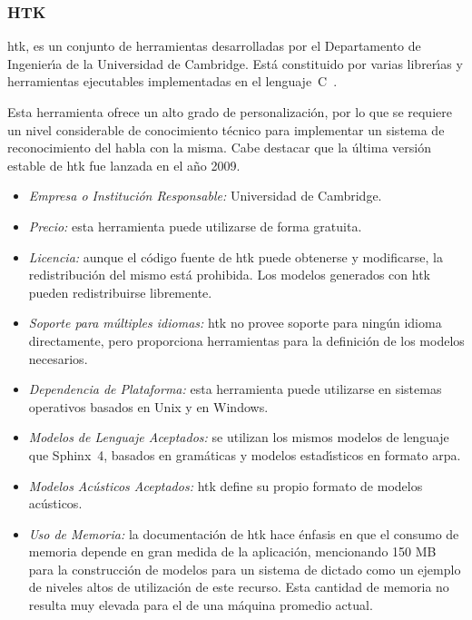 \subsubsection{HTK}
\label{sec:htk}

\gls{htk}, es un conjunto de herramientas
desarrolladas por el Departamento de Ingenier{\'\i}a de la Universidad de Cambridge. Est\'a constituido
por varias librer{\'\i}as y herramientas ejecutables implementadas en el \mbox{lenguaje C \cite{HTKHomePage}}.

Esta herramienta ofrece un alto grado de personalizaci\'on, por lo que se requiere un nivel considerable
de conocimiento t\'ecnico para implementar un sistema de reconocimiento del habla con la misma.
Cabe destacar que la \'ultima versi\'on estable de \gls{htk} fue lanzada en el a\~no 2009.

\begin{itemize}
	\item \emph{Empresa o Instituci\'on Responsable:} Universidad de Cambridge.
	\item \emph{Precio:} esta herramienta puede utilizarse de forma gratuita.
	\item \emph{Licencia:} aunque el c\'odigo fuente de \gls{htk} puede obtenerse y modificarse,
	la redistribuci\'on del mismo est\'a prohibida. Los modelos generados con \gls{htk} pueden
	redistribuirse libremente.
	\item \emph{Soporte para m\'ultiples idiomas:} \gls{htk} no provee soporte para ning\'un
	idioma directamente, pero proporciona herramientas para la definici\'on de los modelos necesarios.
	\item \emph{Dependencia de Plataforma:} esta herramienta puede utilizarse en sistemas operativos
	basados en Unix y en Windows.
	\item \emph{Modelos de Lenguaje Aceptados:} se utilizan los mismos modelos de lenguaje que \mbox{Sphinx 4},
	basados en gram\'aticas y modelos estad{\'\i}sticos en formato \gls{arpa}.
	\item \emph{Modelos Ac\'usticos Aceptados:} \gls{htk} define su propio formato de modelos ac\'usticos.
	\item \emph{Uso de Memoria:} la documentaci\'on de \gls{htk} hace \'enfasis en que el consumo de memoria depende en
	gran medida de la aplicaci\'on, mencionando 150 MB para la construcci\'on de modelos para un sistema de
	dictado como un ejemplo de niveles altos de utilizaci\'on de este recurso.
	Esta cantidad de memoria no resulta muy elevada para el  de una m\'aquina promedio actual.
\end{itemize}